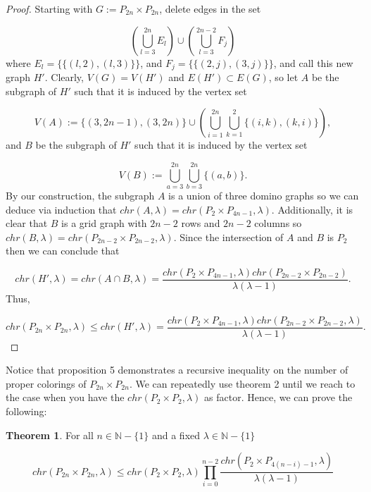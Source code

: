 \documentclass[11pt]{article}
\theoremstyle{definition}
\newcommand{\N}{{\mathbb{N}}}
\newtheorem{thm}{Theorem}
\begin{document}
\begin{proof}
Starting with $G := P_{2n} \times P_{2n}$, delete edges in the set 

\begin{equation}
(\bigcup_{l = 3}^{2n} E_l) \cup (\bigcup_{l = 3}^{2n - 2} F_j) \nonumber
\end{equation} where $E_{l} = \{\{(l,2), (l,3)\}\}$, and $F_j = \{\{(2,j), (3,j)\}\}$, and call this new graph $H'$. Clearly, $V(G) = V(H')$ and $E(H') \subset E(G)$, so let $A$ be the subgraph of $H'$ such that it is induced by the vertex set 

\begin{equation}
V(A) := \{(3,2n - 1), (3,2n)\} \cup (\bigcup_{i = 1}^{2n} \bigcup_{k = 1}^{2} \{(i,k),(k,i)\}), \nonumber
\end{equation} and $B$ be the subgraph of $H'$ such that it is induced by the vertex set 

\begin{equation}
V(B) := \bigcup_{a = 3}^{2n} \bigcup_{b = 3}^{2n} \{(a,b)\}. \nonumber
\end{equation} By our construction, the subgraph $A$ is a union of three domino graphs so we can deduce via induction that $chr(A,\lambda) = chr(P_{2} \times P_{4n - 1}, \lambda)$. Additionally, it is clear that $B$ is a grid graph with $2n - 2$ rows and $2n - 2$ columns so $chr(B, \lambda) = chr(P_{2n-2}\times P_{2n-2},\lambda)$. Since the intersection of $A$ and $B$ is $P_2$ then we can conclude that 

\begin{equation}
chr(H', \lambda) = chr(A \cap B, \lambda) = \frac{chr(P_2 \times P_{4n - 1}, \lambda)chr(P_{2n - 2} \times P_{2n - 2})}{\lambda(\lambda - 1)}. \nonumber
\end{equation} Thus, 

\begin{equation}
chr(P_{2n} \times P_{2n},\lambda) \leq chr(H',\lambda) = \frac{chr(P_{2} \times P_{4n - 1},\lambda)chr(P_{2n - 2} \times P_{2n - 2}, \lambda)}{\lambda(\lambda - 1)}. \nonumber
\end{equation}
\end{proof}

Notice that proposition 5 demonstrates a recursive inequality on the number of proper colorings of $P_{2n} \times P_{2n}$. We can repeatedly use theorem 2 until we reach to the case when you have the $chr(P_2 \times P_2, \lambda)$ as factor. Hence, we can prove the following:

\begin{thm}
For all $n \in \N - \{1\}$ and a fixed $\lambda \in \N - \{1\}$

\begin{equation}
chr(P_{2n} \times P_{2n},\lambda) \leq chr(P_{2} \times P_{2}, \lambda)\prod_{i = 0}^{n - 2}\frac{chr(P_{2} \times P_{4(n - i) - 1}, \lambda)}{\lambda(\lambda - 1)}
\end{equation}

\end{thm}
\end{document}
